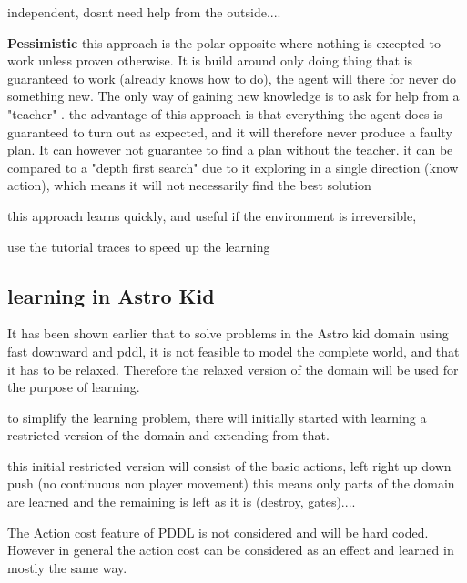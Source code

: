 				independent, dosnt need help from the outside....

		
		
	\textbf{Pessimistic} this approach is the polar opposite where nothing is excepted to work unless proven otherwise. It is build around only doing thing that is guaranteed to work (already knows how to do), the agent will there for never do something new. The only way of gaining new knowledge is to ask for help from a "teacher" \cite{Action-Schemas}.
	the advantage of this approach is that everything the agent does is guaranteed to turn out as expected, and it will therefore never produce a faulty plan. It can however not guarantee to find a plan without the teacher.
	it can be compared to a "depth first search" due to it exploring in a single direction (know action), which means it will not necessarily find the best solution
	
	this approach learns quickly, and useful if the environment is irreversible,
	
	

	
		
	use the tutorial traces to speed up the learning
		
	
	\subsection{learning in Astro Kid}
	It has been shown earlier that to solve problems in the Astro kid domain using fast downward and pddl, it is not feasible to model the complete world, and that it has to be relaxed. Therefore the relaxed version of the domain will be used for the purpose of learning.
	
	
	to simplify the learning problem, there will initially started with learning a restricted version of the domain and extending from that. 
	
	
	
	
	this initial restricted version will consist of the basic actions, left right up down push (no continuous non player movement)
	this means only parts of the domain are learned and the remaining is left as it is (destroy, gates)....

	The Action cost feature of PDDL is not considered and will be hard coded. However in general the action cost can be considered as an effect and learned in mostly the same way.

